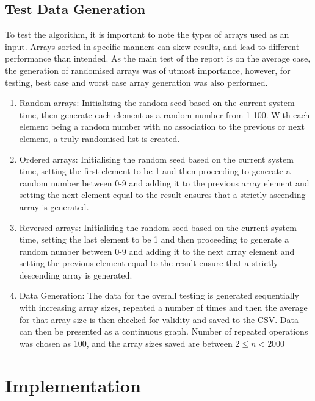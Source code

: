 \documentclass[]{article}
\begin{document}
\subsection{Test Data Generation}
To test the algorithm, it is important to note the types of arrays used as an input. Arrays sorted in specific manners can skew results, and lead to different performance than intended. As the main test of the report is on the average case, the generation of randomised arrays was of utmost importance, however, for testing, best case and worst case array generation was also performed. 

\begin{enumerate}
	\item Random arrays: Initialising the random seed based on the current system time, then generate each element as a random number from 1-100. With each element being a random number with no association to the previous or next element, a truly randomised list is created.
	\item Ordered arrays: Initialising the random seed based on the current system time, setting the first element to be 1 and then proceeding to generate a random number between 0-9 and adding it to the previous array element and setting the next element equal to the result ensures that a strictly ascending array is generated.
	\item Reversed arrays: Initialising the random seed based on the current system time, setting the last element to be 1 and then proceeding to generate a random number between 0-9 and adding it to the next array element and setting the previous element equal to the result ensure that a strictly descending array is generated.
	\item Data Generation: The data for the overall testing is generated sequentially with increasing array sizes, repeated a number of times and then the average for that array size is then checked for validity and saved to the CSV. Data can then be presented as a continuous graph. Number of repeated operations was chosen as 100, and the array sizes saved are between $2\le n < 2000$
\end{enumerate}
\section{Implementation}
\end{document}
